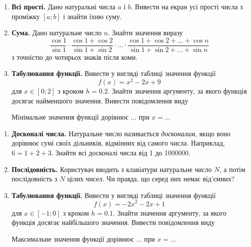 


\begin{enumerate}
\item \textbf{Всі прості.} Дано натуральні числа $a$ і $b$. Вивести на екран усі прості числа з проміжку $[a; b]$ і знайти їхню суму.
\item \textbf{Сума.} Дано натуральне число $n$. Знайти значення виразу
$$
\frac{\cos 1}{\sin 1}\cdot\frac{\cos 1+\cos 2}{\sin 1+\sin 2}\cdot\ldots\cdot\frac{\cos 1+\cos 2 +\ldots+\cos n}{\sin 1+\sin 2+\ldots+\sin n}
$$
з точністю до чотирьох знаків після коми.
\item \textbf{Табулювання функції.} Вивести у вигляді таблиці значення функції
$$
f(x)=x^2-2x+9
$$
для $x \in [0; 2]$ з кроком $ h = 0.2 $. Знайти значення аргументу, за якого функція досягає найменшого значення. Вивести повідомлення виду

{\ttfamily\color{blue} Мінімальне значення функції дорівнює $\ldots$  при  $x = \ldots $ }
\end{enumerate}

 


\begin{enumerate}
\item \textbf{Досконалі числа.} Натуральне число називається {\itshape досконалим}, якщо воно дорівнює
сумі своїх дільників, відмінних від самого числа. Наприклад, $6 =
1+2+3$. Знайти всі досконалі числа від 1 до 1000000.
\item \textbf{Послідовність.} Користувач вводить з клавіатури натуральне число $N$, а потім по\-слі\-дов\-ність з $N$ цілих чисел. Чи правда, що серед них немає від'ємних?
\item \textbf{Табулювання функції.} Вивести у вигляді таблиці значення функції
$$
f(x)=-2x^2-2x+1
$$
для $ x \in [-1; 0]$ з кроком $h=0.1$. Знайти значення аргументу, за якого функція досягає найбільшого значення. Вивести повідомлення виду

 {\ttfamily\color{blue} Максимальне значення функції дорівнює $\ldots$  при  $x = \ldots $ }
\end{enumerate}

 


